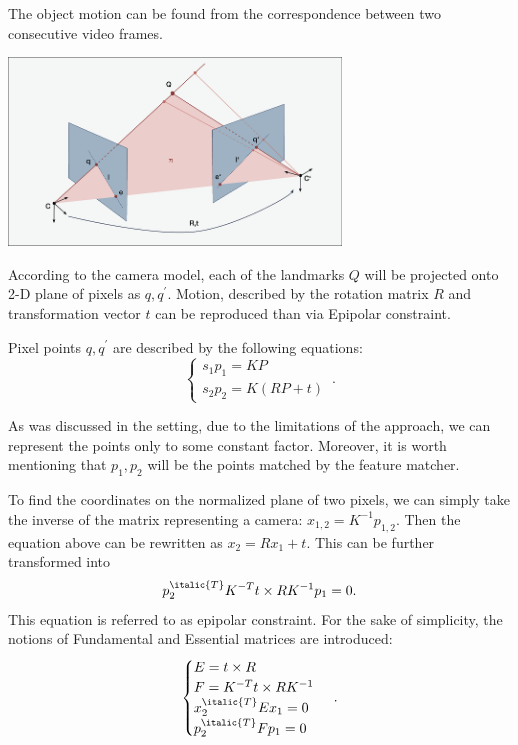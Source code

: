 The object motion can be found from the correspondence between two consecutive video frames. 
\begin{center}
    \includegraphics[height=5cm]{nc.png}\\[1cm]
\end{center}

According to the camera model, each of the landmarks $Q$ will be projected onto 2-D plane of pixels as $q, q^{\prime}$. Motion, described by the rotation matrix $R$ and transformation vector $t$ can be reproduced than via Epipolar constraint. 

Pixel points $q, q^{\prime}$ are described by the following equations:
\begin{equation}
    \begin{cases}
      s_{1} p_{1} = K P\\
      s_{2} p_{2} = K(RP + t)
    \end{cases}\,.
\end{equation}

As was discussed in the setting, due to the limitations of the approach, we can represent the points only to some constant factor. Moreover, it is worth mentioning that $p_{1}, p_{2}$ will be the points matched by the feature matcher.

To find the coordinates on the normalized plane of two pixels, we can simply take the inverse of the matrix representing a camera:
$x_{1, 2} = K^{-1}p_{1, 2}.$ Then the equation above can be rewritten as $x_{2} = Rx_{1} + t.$ This can be further transformed into $$p_{2}^{\italic{T}} K^{-T} t \times R K^{-1} p_{1} = 0.$$ This equation is referred to as epipolar constraint. For the sake of simplicity, the notions of Fundamental and Essential matrices are introduced:
\begin{equation}
    \begin{cases}
      E = t \times R\\
      F = K^{-T} t \times R K^{-1}\\
      x_{2}^{\italic{T}} E x_{1} = 0\\
      p_{2}^{\italic{T}} F p_{1} = 0
    \end{cases}\,.
\end{equation}

